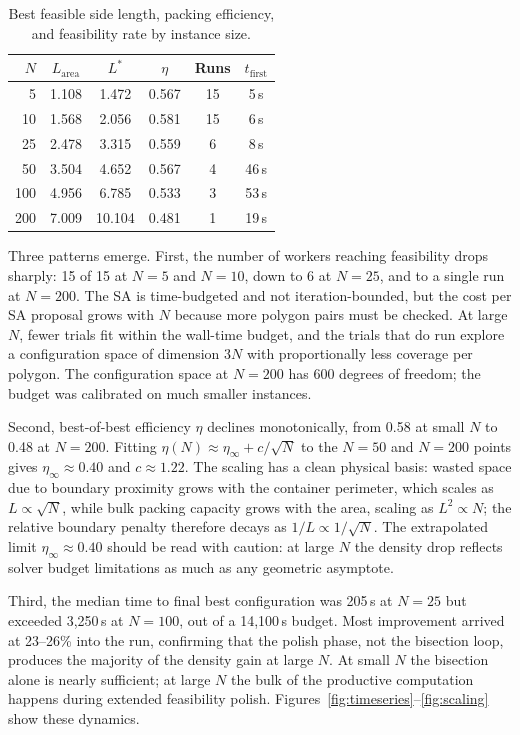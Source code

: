 \documentclass[10pt,twocolumn]{article}
\begin{document}
\begin{table}[h]
\centering\small
\setlength{\tabcolsep}{3.5pt}
\caption{Best feasible side length, packing efficiency, and
feasibility rate by instance size.}
\label{tab:results}
\begin{tabular}{r@{\hskip6pt}ccccc}
\toprule
$N$ & $L_{\mathrm{area}}$ & $L^*$ & $\eta$ & Runs &
$t_{\mathrm{first}}$ \\
\midrule
  5 & 1.108 & 1.472 & 0.567 & 15 &  5\,s \\
 10 & 1.568 & 2.056 & 0.581 & 15 &  6\,s \\
 25 & 2.478 & 3.315 & 0.559 &  6 &  8\,s \\
 50 & 3.504 & 4.652 & 0.567 &  4 & 46\,s \\
100 & 4.956 & 6.785 & 0.533 &  3 & 53\,s \\
200 & 7.009 & 10.104& 0.481 &  1 & 19\,s \\
\bottomrule
\end{tabular}
\end{table}

Three patterns emerge. First, the number of workers reaching
feasibility drops sharply: 15 of 15 at $N = 5$ and $N = 10$, down to
6 at $N = 25$, and to a single run at $N = 200$. The SA is
time-budgeted and not iteration-bounded, but the cost per SA proposal
grows with $N$ because more polygon pairs must be checked. At large
$N$, fewer trials fit within the wall-time budget, and the trials that
do run explore a configuration space of dimension $3N$ with
proportionally less coverage per polygon. The configuration space at
$N = 200$ has 600 degrees of freedom; the budget was calibrated on
much smaller instances.

Second, best-of-best efficiency $\eta$ declines monotonically, from
0.58 at small $N$ to 0.48 at $N = 200$. Fitting $\eta(N) \approx
\eta_\infty + c/\!\sqrt{N}$ to the $N = 50$ and $N = 200$ points
gives $\eta_\infty \approx 0.40$ and $c \approx 1.22$. The scaling
has a clean physical basis: wasted space due to boundary proximity
grows with the container perimeter, which scales as $L \propto
\sqrt{N}$, while bulk packing capacity grows with the area, scaling
as $L^2 \propto N$; the relative boundary penalty therefore decays as
$1/L \propto 1/\!\sqrt{N}$. The extrapolated limit $\eta_\infty
\approx 0.40$ should be read with caution: at large $N$ the density
drop reflects solver budget limitations as much as any geometric
asymptote.

Third, the median time to final best configuration was 205\,s at
$N = 25$ but exceeded 3{,}250\,s at $N = 100$, out of a 14{,}100\,s
budget. Most improvement arrived at 23--26\% into the run, confirming
that the polish phase, not the bisection loop, produces the majority
of the density gain at large $N$. At small $N$ the bisection alone is
nearly sufficient; at large $N$ the bulk of the productive computation
happens during extended feasibility polish.
Figures~\ref{fig:timeseries}--\ref{fig:scaling} show these dynamics.
\end{document}
